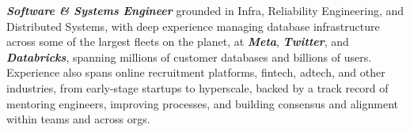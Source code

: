 \begin{cvparagraph}
	\textbf{\textit{Software \& Systems Engineer}} grounded in Infra, Reliability
	Engineering, and Distributed Systems, with deep experience managing database
	infrastructure across some of the largest fleets on the planet, at
	\textbf{\textit{Meta}}, \textbf{\textit{Twitter}}, and
	\textbf{\textit{Databricks}}, spanning millions of customer databases and
	billions of users. Experience also spans online recruitment platforms,
	fintech, adtech, and other industries, from early-stage startups to
	hyperscale, backed by a track record of mentoring engineers, improving
	processes, and building consensus and alignment within teams and across orgs.
\end{cvparagraph}
